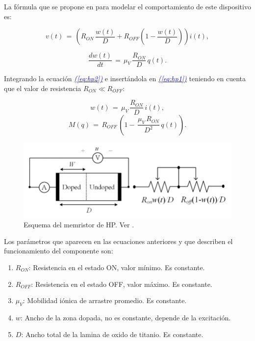 \documentclass[12pt,a4paper]{report} %
\newcommand{\eref}[1]{\hyperref[#1]{\textcolor{blue}{\textit{(\ref*{#1})}}}}
\begin{document}
	La fórmula que se propone en \cite{HP} para modelar el comportamiento de este dispositivo es:
	
	\begin{equation}
		v(t)\,=\,\left(R_{ON}\,\frac{w(t)}{D}+R_{OFF}\left(1-\frac{w(t)}{D}\right)\right)i(t),
		\label{eq:hp1}
	\end{equation}
	
	\begin{equation}
		\frac{dw(t)}{dt}\,=\,\mu_V\,\frac{R_{ON}}{D}\,q(t).
		\label{eq:hp2}
	\end{equation}\smallskip
	
	Integrando la ecuación \eref{eq:hp2} e insertándola en \eref{eq:hp1} teniendo en cuenta que el valor de resistencia  $R_{ON} \ll R_{OFF}$: 
	
	\begin{equation}
		w(t)\,=\,\mu_V\,\frac{R_{ON}}{D}\,i(t),
		\label{eq:hp3}
	\end{equation}\smallskip
	\begin{equation}
		M(q)\,=\,R_{OFF}\,\left(1-\,\frac{\mu_V\,R_{ON}}{D^2}\,q(t)\right).
		\label{eq:hp4}
	\end{equation}\smallskip
	
	\begin{figure}[h]
		\centering
		\includegraphics[width=1\textwidth]{schmem.png}
		\caption{Esquema del memristor de HP. Ver \cite{2021}.}
		\label{fig:2021}
	\end{figure}\smallskip
	
	Los parámetros que aparecen en las ecuaciones anteriores y que describen el funcionamiento del componente son:
	
	\begin{enumerate}
		\item $R_{ON}$: Resistencia en el estado ON, valor mínimo. Es constante.
		\item $R_{OFF}$: Resistencia en el estado OFF, valor máximo. Es constante.
		\item $\mu_V$: Mobilidad iónica de arrastre promedio. Es constante.
		\item $w$: Ancho de la zona dopada, no es constante, depende de la excitación.
		\item $D$: Ancho total de la lamina de oxido de titanio. Es constante.
	\end{enumerate}
	\newpage
	
\end{document}
